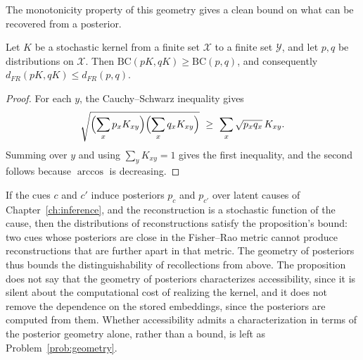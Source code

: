 The monotonicity property of this geometry gives a clean bound on what can be recovered from a posterior.

\begin{proposition}\label{prop:dpi}
Let $K$ be a stochastic kernel from a finite set $\mathcal X$ to a finite set $\mathcal Y$, and let $p,q$ be distributions on $\mathcal X$. Then $\mathrm{BC}(pK,qK)\ge\mathrm{BC}(p,q)$, and consequently $d_{FR}(pK,qK)\le d_{FR}(p,q)$.
\end{proposition}

\begin{proof}
For each $y$, the Cauchy--Schwarz inequality gives
\begin{equation*}
\sqrt{\Bigl(\sum_xp_xK_{xy}\Bigr)\Bigl(\sum_xq_xK_{xy}\Bigr)}\ \ge\ \sum_x\sqrt{p_xq_x}\,K_{xy}.
\end{equation*}
 Summing over $y$ and using $\sum_yK_{xy}=1$ gives the first inequality, and the second follows because $\arccos$ is decreasing.
\end{proof}

If the cues $c$ and $c'$ induce posteriors $p_c$ and $p_{c'}$ over latent causes of Chapter~\ref{ch:inference}, and the reconstruction is a stochastic function of the cause, then the distributions of reconstructions satisfy the proposition's bound: two cues whose posteriors are close in the Fisher--Rao metric cannot produce reconstructions that are further apart in that metric. The geometry of posteriors thus bounds the distinguishability of recollections from above. The proposition does not say that the geometry of posteriors characterizes accessibility, since it is silent about the computational cost of realizing the kernel, and it does not remove the dependence on the stored embeddings, since the posteriors are computed from them. Whether accessibility admits a characterization in terms of the posterior geometry alone, rather than a bound, is left as Problem~\ref{prob:geometry}.

